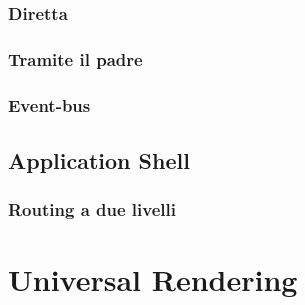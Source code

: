 \subsubsection*{Diretta}
\subsubsection*{Tramite il padre}
\subsubsection*{Event-bus}


\subsection*{Application Shell}


\subsubsection*{Routing a due livelli}




\pagebreak
\section*{Universal Rendering}